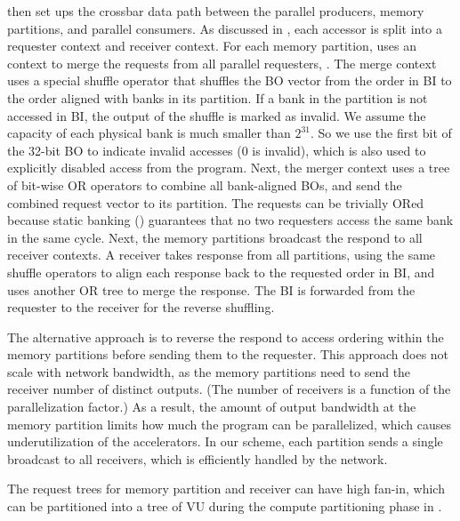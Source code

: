 \name{} then set ups the crossbar data path between the parallel producers, memory partitions, and parallel consumers.
As discussed in , each accessor is split into a requester context and receiver context.
For each memory partition, \name{} uses an context to merge the requests from all parallel requesters, .
The merge context uses a special shuffle operator that shuffles the BO vector from the order in BI to the order aligned with banks in its partition.
If a bank in the partition is not accessed in BI, the output of the shuffle is marked as invalid.
We assume the capacity of each physical bank is much smaller than $2^{31}$. 
So we use the first bit of the 32-bit BO to indicate invalid accesses (0 is invalid), which is also used to explicitly disabled access from the program.
Next, the merger context uses a tree of bit-wise OR operators to combine all bank-aligned BOs, and send the combined request vector to its partition.
The requests can be trivially ORed because static banking () guarantees that no two requesters access the same bank in the same cycle.
Next, the memory partitions broadcast the respond to all receiver contexts.
A receiver takes response from all partitions, using the same shuffle operators to align each response back to the requested order in BI, and uses another OR tree to merge the response. 
The BI is forwarded from the requester to the receiver for the reverse shuffling.

The alternative approach is to reverse the respond to access ordering within the memory partitions before sending them to the requester.
This approach does not scale with network bandwidth, as the memory partitions need to send the receiver number of distinct outputs.
(The number of receivers is a function of the parallelization factor.) 
As a result, the amount of output bandwidth at the memory partition limits how much the program can be parallelized, which causes underutilization of the accelerators.
In our scheme, each partition sends a single broadcast to all receivers, which is efficiently handled by the network.

The request trees for memory partition and receiver can have high fan-in, which can 
be partitioned into a tree of VU during the compute partitioning phase in .

